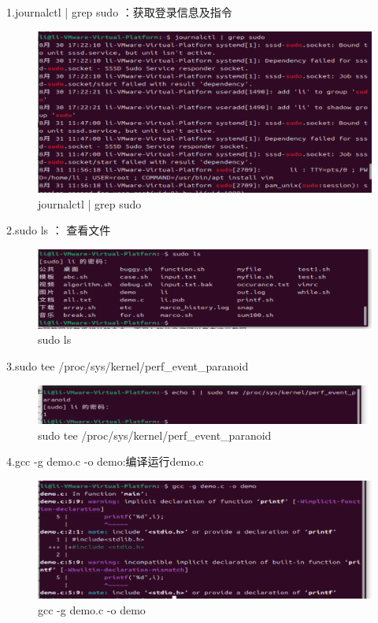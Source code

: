 \documentclass[a4paper, 12pt]{article}
\begin{document}
1.journalctl | grep sudo ：获取登录信息及指令
\begin{figure}[H]
  \centering
  \includegraphics[width=\textwidth]{屏幕截图 2024-09-15 115913.png}
  \caption{journalctl | grep sudo}
\end{figure}


2.sudo ls ： 查看文件
\begin{figure}[H]
  \centering
  \includegraphics[width=\textwidth]{屏幕截图 2024-09-15 115836.png}
  \caption{sudo ls}
\end{figure}

3.sudo tee /proc/sys/kernel/perf\_event\_paranoid
\begin{figure}[H]
  \centering
  \includegraphics[width=\textwidth]{屏幕截图 2024-09-15 162052.png}
  \caption{sudo tee /proc/sys/kernel/perf\_event\_paranoid}
\end{figure}

4.gcc -g demo.c -o demo:编译运行demo.c 
\begin{figure}[H]
  \centering
  \includegraphics[width=\textwidth]{屏幕截图 2024-09-15 162147.png}
  \caption{gcc -g demo.c -o demo}
\end{figure}
\end{document}
